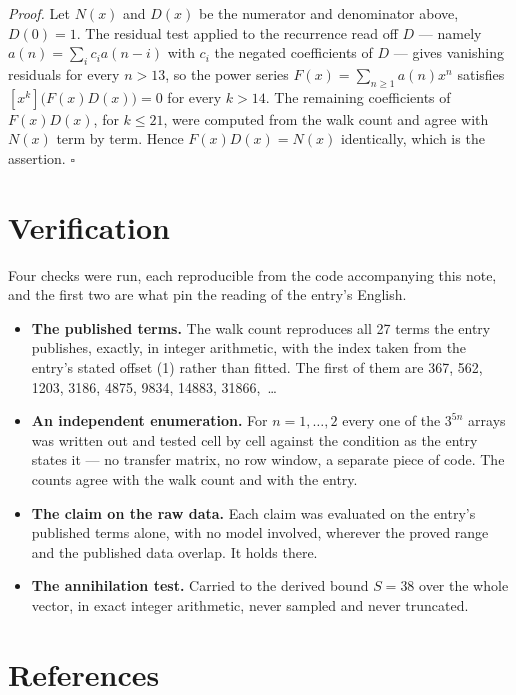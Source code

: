 \documentclass[11pt]{article}
\theoremstyle{definition}
\begin{document}
{\itshape Proof.} Let $N(x)$ and $D(x)$ be the numerator and denominator above, $D(0)=1$. The residual test applied to the recurrence read off $D$ --- namely $a(n) = \sum_i c_i a(n-i)$ with $c_i$ the negated coefficients of $D$ --- gives vanishing residuals for every $n > 13$, so the power series $F(x)=\sum_{n\ge 1}a(n)x^n$ satisfies $[x^k]\bigl(F(x)D(x)\bigr) = 0$ for every $k > 14$. The remaining coefficients of $F(x)D(x)$, for $k \le 21$, were computed from the walk count and agree with $N(x)$ term by term. Hence $F(x)D(x) = N(x)$ identically, which is the assertion. $\square$

\section{Verification}

Four checks were run, each reproducible from the code accompanying this note, and the first two are what pin the reading of the entry's English.

\begin{itemize}

\item {\bfseries The published terms.} The walk count reproduces all 27 terms the entry publishes, exactly, in integer arithmetic, with the index taken from the entry's stated offset (1) rather than fitted. The first of them are 367, 562, 1203, 3186, 4875, 9834, 14883, 31866,~\dots

\item {\bfseries An independent enumeration.} For $n = 1,\dots,2$ every one of the $3^{5n}$ arrays was written out and tested cell by cell against the condition as the entry states it --- no transfer matrix, no row window, a separate piece of code. The counts agree with the walk count and with the entry.

\item {\bfseries The claim on the raw data.} Each claim was evaluated on the entry's published terms alone, with no model involved, wherever the proved range and the published data overlap. It holds there.

\item {\bfseries The annihilation test.} Carried to the derived bound $S = 38$ over the whole vector, in exact integer arithmetic, never sampled and never truncated.

\end{itemize}

\section{References}
\end{document}
